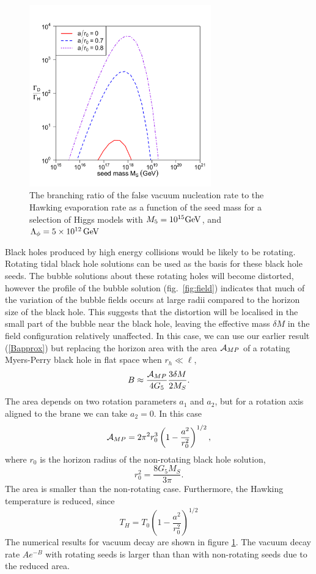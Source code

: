 \documentclass[aps,12pt,prd,superscriptaddress,preprintnumbers, 
	amssymb,
	amsmath,
	notitlepage,
	longbibliography,
	nofootinbib]{revtex4-1}
\newcommand{\be}{\begin{equation}}
\newcommand{\ee}{\end{equation}}
\begin{document}
\begin{figure}[htb]
\centering
\includegraphics[width=0.7\textwidth]{Rotation.pdf}
\caption{
The branching ratio of the false vacuum nucleation rate to 
the Hawking evaporation rate as a function of the seed mass 
for a selection of Higgs models with $M_5=10^{15}{\rm GeV}$,
and $\Lambda_\phi=5\times 10^{12}\,{\rm GeV}$}
\label{fig:rotating}
\end{figure}

Black holes produced by high energy collisions would be likely to 
be rotating. Rotating tidal black hole solutions \cite{Aliev:2005bi} 
can be used as the basis for these black hole seeds. 
The bubble solutions about these rotating holes will become
distorted, however the profile of the bubble solution (fig.\ \ref{fig:field})
indicates that much of the variation of the bubble fields occurs at large
radii compared to the horizon size of the black hole. This
suggests that the distortion will be localised in the 
small part of the bubble near the black hole,
leaving the effective mass $\delta M$ in the field configuration 
relatively unaffected.
In this case, we can use our earlier result (\ref{Bapprox}) but 
replacing the horizon area with the area ${\cal A}_{MP}$ of a rotating 
Myers-Perry black hole in flat space \cite{Myers:1986un} when $r_h\ll \ell$,
\be
B\approx \frac{{\cal A}_{MP}}{4G_5}\frac{3\delta M}{2M_S}.
\ee
The area depends on two rotation parameters $a_1$ and $a_2$, 
but for a rotation axis aligned to the brane we can take $a_2=0$. 
In this case
\be
{\cal A}_{MP}=2\pi^2r_0^3\left(1-\frac{a^2}{r_0^2}\right)^{1/2},
\ee
where $r_0$ is the horizon radius of the non-rotating black hole solution,
\be
r_0^2=\frac{8G_5M_S}{3\pi}.
\ee
The area is smaller than the non-rotating case.
Furthermore, the Hawking temperature is reduced, since
\be
T_H=T_0\left(1- \frac{a^2}{r_0^2}\right)^{1/2}
\ee
The numerical results for vacuum decay are shown in figure \ref{fig:rotating}.
The vacuum decay rate $Ae^{-B}$ with rotating seeds is larger 
than than with non-rotating seeds due to the reduced area.
\end{document}
